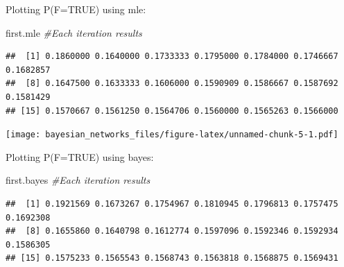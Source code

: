 \documentclass[
]{article}
\newenvironment{Shaded}{\begin{snugshade}}{\end{snugshade}}
\newcommand{\AttributeTok}[1]{\textcolor[rgb]{0.77,0.63,0.00}{#1}}
\newcommand{\CommentTok}[1]{\textcolor[rgb]{0.56,0.35,0.01}{\textit{#1}}}
\newcommand{\DecValTok}[1]{\textcolor[rgb]{0.00,0.00,0.81}{#1}}
\newcommand{\FloatTok}[1]{\textcolor[rgb]{0.00,0.00,0.81}{#1}}
\newcommand{\FunctionTok}[1]{\textcolor[rgb]{0.00,0.00,0.00}{#1}}
\newcommand{\NormalTok}[1]{#1}
\newcommand{\OtherTok}[1]{\textcolor[rgb]{0.56,0.35,0.01}{#1}}
\newcommand{\SpecialCharTok}[1]{\textcolor[rgb]{0.00,0.00,0.00}{#1}}
\newcommand{\StringTok}[1]{\textcolor[rgb]{0.31,0.60,0.02}{#1}}
\begin{document}
Plotting P(F=TRUE) using mle:

\begin{Shaded}
\begin{Highlighting}[]
\NormalTok{first.mle }\CommentTok{\#Each iteration results}
\end{Highlighting}
\end{Shaded}

\begin{verbatim}
##  [1] 0.1860000 0.1640000 0.1733333 0.1795000 0.1784000 0.1746667 0.1682857
##  [8] 0.1647500 0.1633333 0.1606000 0.1590909 0.1586667 0.1587692 0.1581429
## [15] 0.1570667 0.1561250 0.1564706 0.1560000 0.1565263 0.1566000
\end{verbatim}

\begin{Shaded}
\end{Shaded}

\texttt{[image: bayesian\_networks\_files/figure-latex/unnamed-chunk-5-1.pdf]}

Plotting P(F=TRUE) using bayes:

\begin{Shaded}
\begin{Highlighting}[]
\NormalTok{first.bayes }\CommentTok{\#Each iteration results}
\end{Highlighting}
\end{Shaded}

\begin{verbatim}
##  [1] 0.1921569 0.1673267 0.1754967 0.1810945 0.1796813 0.1757475 0.1692308
##  [8] 0.1655860 0.1640798 0.1612774 0.1597096 0.1592346 0.1592934 0.1586305
## [15] 0.1575233 0.1565543 0.1568743 0.1563818 0.1568875 0.1569431
\end{verbatim}
\end{document}
